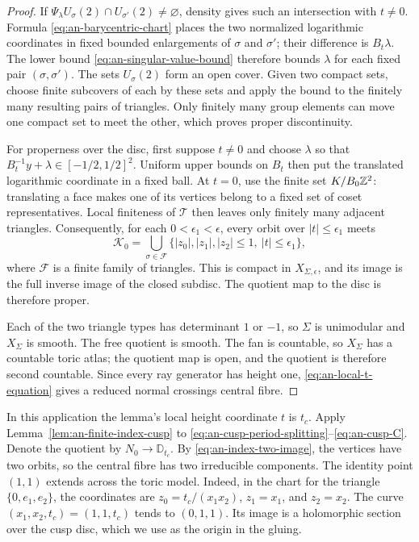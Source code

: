 \begin{proof}
If
$\Psi_\lambda U_\sigma(2)\cap U_{\sigma'}(2)\ne\varnothing$, density
gives such an intersection with $t\ne0$.  Formula
\eqref{eq:an-barycentric-chart} places the two normalized logarithmic
coordinates in
fixed bounded enlargements of $\sigma$ and $\sigma'$; their difference
is $B_t\lambda$.  The lower bound
\eqref{eq:an-singular-value-bound} therefore bounds $\lambda$ for each
fixed pair $(\sigma,\sigma')$.  The sets $U_\sigma(2)$ form an open
cover.  Given two compact sets, choose
finite subcovers of each by these sets and apply the bound to the finitely
many resulting pairs of triangles.  Only finitely many group elements can
move one compact set to meet the other, which proves proper discontinuity.

For properness over the disc, first suppose $t\ne0$ and choose
$\lambda$ so that
$B_t^{-1}y+\lambda\in[-1/2,1/2]^2$.
Uniform upper bounds on $B_t$ then put the translated logarithmic coordinate
in a fixed ball.  At $t=0$, use the finite set
$K/B_0\mathbb Z^2$: translating a face makes one of its vertices belong to a
fixed set of coset representatives.  Local finiteness of $\mathcal T$
then leaves only finitely many adjacent triangles.  Consequently, for each
$0<\epsilon_1<\epsilon$, every orbit over
$|t|\leq\epsilon_1$ meets
\begin{equation*}
 \mathcal K_0=
 \bigcup_{\sigma\in\mathcal F}
 \{|z_0|,|z_1|,|z_2|\leq1,\ |t|\leq\epsilon_1\},
\end{equation*}
where $\mathcal F$ is a finite family of triangles.  This is compact in
$X_{\Sigma,\epsilon}$, and its image is the full inverse image of the
closed subdisc.  The quotient map to the disc is therefore proper.

Each of the two triangle types has determinant $1$ or $-1$, so
$\Sigma$ is unimodular and $X_\Sigma$ is smooth.  The free quotient is
smooth.  The fan is countable, so $X_\Sigma$ has a countable toric atlas;
the quotient map is open, and the quotient is therefore second countable.
Since every ray generator has height one,
\eqref{eq:an-local-t-equation} gives a reduced normal crossings central
fibre.
\end{proof}

In this application the lemma's local height coordinate $t$ is
$t_c$.  Apply Lemma~\ref{lem:an-finite-index-cusp} to
\eqref{eq:an-cusp-period-splitting}--\eqref{eq:an-cusp-C}.  Denote the
quotient by $N_0\to\mathbb D_{t_c}$.
By \eqref{eq:an-index-two-image}, the vertices have two orbits, so the
central fibre has two irreducible components.  The identity point
$(1,1)$ extends across the toric model.  Indeed, in the chart for the
triangle $\{0,e_1,e_2\}$, the coordinates are
$z_0=t_c/(x_1x_2)$, $z_1=x_1$, and $z_2=x_2$.
The curve $(x_1,x_2,t_c)=(1,1,t_c)$ tends to $(0,1,1)$.  Its image
is a holomorphic section over the cusp disc, which we use as the origin in
the gluing.

